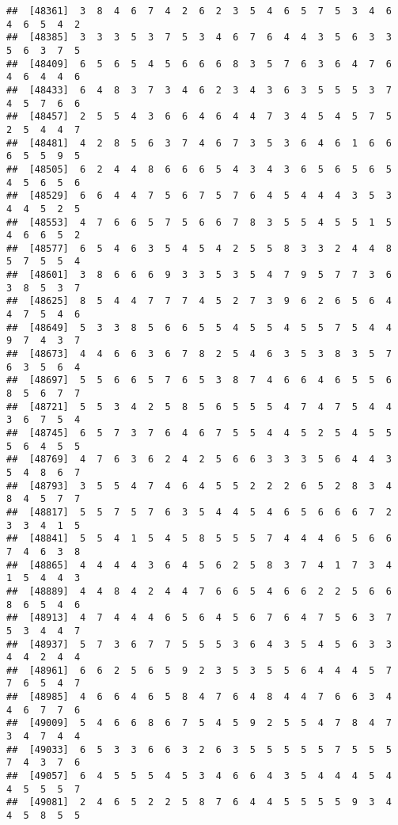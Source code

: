 \documentclass[
]{book}
\begin{document}
\begin{verbatim}
##  [48361]  3  8  4  6  7  4  2  6  2  3  5  4  6  5  7  5  3  4  6  4  6  5  4  2
##  [48385]  3  3  3  5  3  7  5  3  4  6  7  6  4  4  3  5  6  3  3  5  6  3  7  5
##  [48409]  6  5  6  5  4  5  6  6  6  8  3  5  7  6  3  6  4  7  6  4  6  4  4  6
##  [48433]  6  4  8  3  7  3  4  6  2  3  4  3  6  3  5  5  5  3  7  4  5  7  6  6
##  [48457]  2  5  5  4  3  6  6  4  6  4  4  7  3  4  5  4  5  7  5  2  5  4  4  7
##  [48481]  4  2  8  5  6  3  7  4  6  7  3  5  3  6  4  6  1  6  6  6  5  5  9  5
##  [48505]  6  2  4  4  8  6  6  6  5  4  3  4  3  6  5  6  5  6  5  4  5  6  5  6
##  [48529]  6  6  4  4  7  5  6  7  5  7  6  4  5  4  4  4  3  5  3  4  4  5  2  5
##  [48553]  4  7  6  6  5  7  5  6  6  7  8  3  5  5  4  5  5  1  5  4  6  6  5  2
##  [48577]  6  5  4  6  3  5  4  5  4  2  5  5  8  3  3  2  4  4  8  5  7  5  5  4
##  [48601]  3  8  6  6  6  9  3  3  5  3  5  4  7  9  5  7  7  3  6  3  8  5  3  7
##  [48625]  8  5  4  4  7  7  7  4  5  2  7  3  9  6  2  6  5  6  4  4  7  5  4  6
##  [48649]  5  3  3  8  5  6  6  5  5  4  5  5  4  5  5  7  5  4  4  9  7  4  3  7
##  [48673]  4  4  6  6  3  6  7  8  2  5  4  6  3  5  3  8  3  5  7  6  3  5  6  4
##  [48697]  5  5  6  6  5  7  6  5  3  8  7  4  6  6  4  6  5  5  6  8  5  6  7  7
##  [48721]  5  5  3  4  2  5  8  5  6  5  5  5  4  7  4  7  5  4  4  3  6  7  5  4
##  [48745]  6  5  7  3  7  6  4  6  7  5  5  4  4  5  2  5  4  5  5  5  6  4  5  5
##  [48769]  4  7  6  3  6  2  4  2  5  6  6  3  3  3  5  6  4  4  3  5  4  8  6  7
##  [48793]  3  5  5  4  7  4  6  4  5  5  2  2  2  6  5  2  8  3  4  8  4  5  7  7
##  [48817]  5  5  7  5  7  6  3  5  4  4  5  4  6  5  6  6  6  7  2  3  3  4  1  5
##  [48841]  5  5  4  1  5  4  5  8  5  5  5  7  4  4  4  6  5  6  6  7  4  6  3  8
##  [48865]  4  4  4  4  3  6  4  5  6  2  5  8  3  7  4  1  7  3  4  1  5  4  4  3
##  [48889]  4  4  8  4  2  4  4  7  6  6  5  4  6  6  2  2  5  6  6  8  6  5  4  6
##  [48913]  4  7  4  4  4  6  5  6  4  5  6  7  6  4  7  5  6  3  7  5  3  4  4  7
##  [48937]  5  7  3  6  7  7  5  5  5  3  6  4  3  5  4  5  6  3  3  4  4  2  4  4
##  [48961]  6  6  2  5  6  5  9  2  3  5  3  5  5  6  4  4  4  5  7  7  6  5  4  7
##  [48985]  4  6  6  4  6  5  8  4  7  6  4  8  4  4  7  6  6  3  4  4  6  7  7  6
##  [49009]  5  4  6  6  8  6  7  5  4  5  9  2  5  5  4  7  8  4  7  3  4  7  4  4
##  [49033]  6  5  3  3  6  6  3  2  6  3  5  5  5  5  5  7  5  5  5  7  4  3  7  6
##  [49057]  6  4  5  5  5  4  5  3  4  6  6  4  3  5  4  4  4  5  4  4  5  5  5  7
##  [49081]  2  4  6  5  2  2  5  8  7  6  4  4  5  5  5  5  9  3  4  4  5  8  5  5

\end{verbatim}
\end{document}
